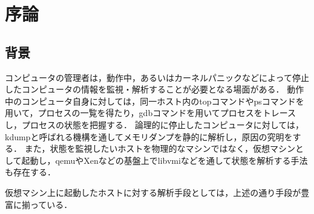 \chapter{序論}
\label{chap:introduction}

\section{背景}
\label{section:background}






コンピュータの管理者は，動作中，あるいはカーネルパニックなどによって停止したコンピュータの情報を監視・解析することが必要となる場面がある．
動作中のコンピュータ自身に対しては，同一ホスト内のtopコマンドやpsコマンドを用いて，プロセスの一覧を得たり，gdbコマンドを用いてプロセスをトレースし，プロセスの状態を把握する．
論理的に停止したコンピュータに対しては，kdumpと呼ばれる機構を通してメモリダンプを静的に解析し，原因の究明をする．
また，状態を監視したいホストを物理的なマシンではなく，仮想マシンとして起動し，qemuやXenなどの基盤上でlibvmiなどを通して状態を解析する手法も存在する．

仮想マシン上に起動したホストに対する解析手段としては，上述の通り手段が豊富に揃っている．



